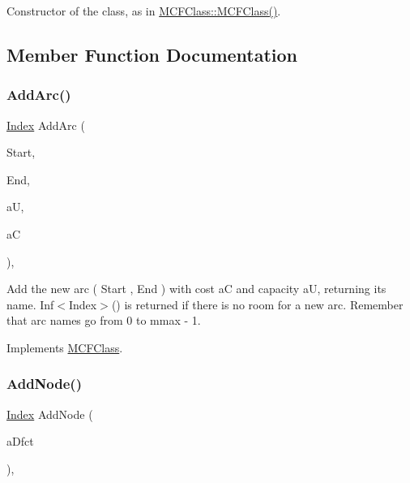 Constructor of the class, as in \mbox{\hyperlink{class_m_c_f_class_ac598fb1a423b3b722414a53c8549953c}{M\+C\+F\+Class\+::\+M\+C\+F\+Class()}}. 

\subsection{Member Function Documentation}
\mbox{\label{class_m_c_f_simplex_a57e7641179f820974444701d4f179fb6}} 
\subsubsection{\texorpdfstring{Add\+Arc()}{AddArc()}}
{\footnotesize\ttfamily \mbox{\hyperlink{class_m_c_f_class_ad53d6229d7ec28555a9c9c2fd9abf773}{Index}} Add\+Arc (\begin{DoxyParamCaption}\item[{\mbox{\hyperlink{class_m_c_f_class_a76aaabb20535c51a2752b93f6c38fe54}{c\+Index}}}]{Start,  }\item[{\mbox{\hyperlink{class_m_c_f_class_a76aaabb20535c51a2752b93f6c38fe54}{c\+Index}}}]{End,  }\item[{\mbox{\hyperlink{class_m_c_f_class_a11f747fbdff346237c8db4469d569994}{c\+F\+Number}}}]{aU,  }\item[{\mbox{\hyperlink{class_m_c_f_class_a07dbefeeb08c3f63073622411893eb76}{c\+C\+Number}}}]{aC }\end{DoxyParamCaption})\hspace{0.3cm}{\ttfamily [override]}, {\ttfamily [virtual]}}

Add the new arc ( Start , End ) with cost aC and capacity aU, returning its name. Inf$<$\+Index$>$() is returned if there is no room for a new arc. Remember that arc names go from 0 to mmax -\/ 1. 

Implements \mbox{\hyperlink{class_m_c_f_class_a564d624f62ccc0c130d733cc5470cb6d}{M\+C\+F\+Class}}.

\mbox{\label{class_m_c_f_simplex_a3b1944c7daf09b4e72cc2eeda39e335d}} 
\subsubsection{\texorpdfstring{Add\+Node()}{AddNode()}}
{\footnotesize\ttfamily \mbox{\hyperlink{class_m_c_f_class_ad53d6229d7ec28555a9c9c2fd9abf773}{Index}} Add\+Node (\begin{DoxyParamCaption}\item[{\mbox{\hyperlink{class_m_c_f_class_a11f747fbdff346237c8db4469d569994}{c\+F\+Number}}}]{a\+Dfct }\end{DoxyParamCaption})\hspace{0.3cm}{\ttfamily [override]}, {\ttfamily [virtual]}}

